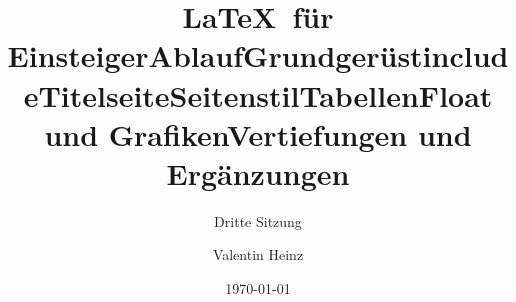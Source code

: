 \documentclass[]{beamer}
\date{}
\author{Valentin Heinz}
\title{\LaTeX \ für Einsteiger}
\subtitle{Dritte Sitzung}
\date{\today}
\begin{document}
\maketitle

\title{Ablauf}


\title{Grundgerüst}


\title{include}


\title{Titelseite}


\title{Seitenstil}


\title{Tabellen}


\title{Float und Grafiken}



\title{Vertiefungen und Ergänzungen}
\end{document}

